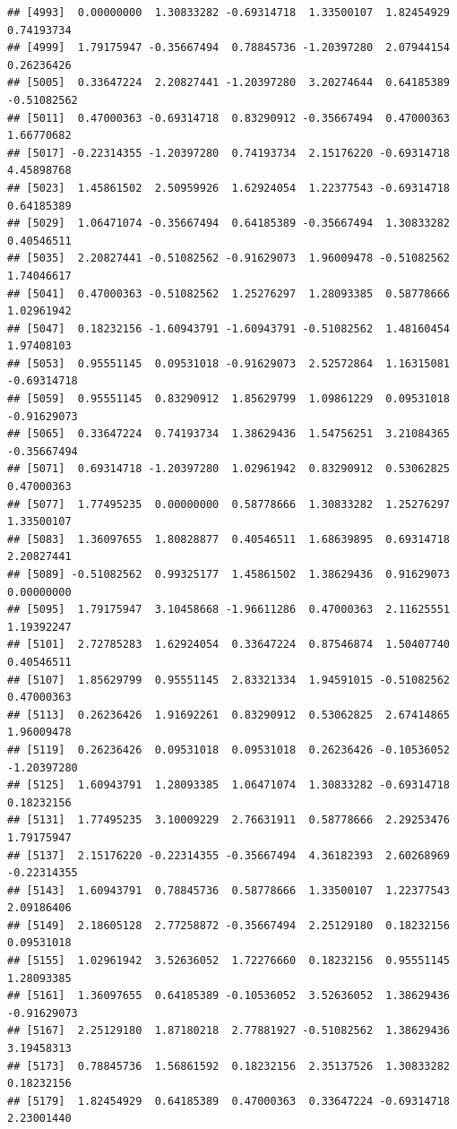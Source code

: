 \documentclass[
]{article}
\begin{document}
\begin{verbatim}
## [4993]  0.00000000  1.30833282 -0.69314718  1.33500107  1.82454929  0.74193734
## [4999]  1.79175947 -0.35667494  0.78845736 -1.20397280  2.07944154  0.26236426
## [5005]  0.33647224  2.20827441 -1.20397280  3.20274644  0.64185389 -0.51082562
## [5011]  0.47000363 -0.69314718  0.83290912 -0.35667494  0.47000363  1.66770682
## [5017] -0.22314355 -1.20397280  0.74193734  2.15176220 -0.69314718  4.45898768
## [5023]  1.45861502  2.50959926  1.62924054  1.22377543 -0.69314718  0.64185389
## [5029]  1.06471074 -0.35667494  0.64185389 -0.35667494  1.30833282  0.40546511
## [5035]  2.20827441 -0.51082562 -0.91629073  1.96009478 -0.51082562  1.74046617
## [5041]  0.47000363 -0.51082562  1.25276297  1.28093385  0.58778666  1.02961942
## [5047]  0.18232156 -1.60943791 -1.60943791 -0.51082562  1.48160454  1.97408103
## [5053]  0.95551145  0.09531018 -0.91629073  2.52572864  1.16315081 -0.69314718
## [5059]  0.95551145  0.83290912  1.85629799  1.09861229  0.09531018 -0.91629073
## [5065]  0.33647224  0.74193734  1.38629436  1.54756251  3.21084365 -0.35667494
## [5071]  0.69314718 -1.20397280  1.02961942  0.83290912  0.53062825  0.47000363
## [5077]  1.77495235  0.00000000  0.58778666  1.30833282  1.25276297  1.33500107
## [5083]  1.36097655  1.80828877  0.40546511  1.68639895  0.69314718  2.20827441
## [5089] -0.51082562  0.99325177  1.45861502  1.38629436  0.91629073  0.00000000
## [5095]  1.79175947  3.10458668 -1.96611286  0.47000363  2.11625551  1.19392247
## [5101]  2.72785283  1.62924054  0.33647224  0.87546874  1.50407740  0.40546511
## [5107]  1.85629799  0.95551145  2.83321334  1.94591015 -0.51082562  0.47000363
## [5113]  0.26236426  1.91692261  0.83290912  0.53062825  2.67414865  1.96009478
## [5119]  0.26236426  0.09531018  0.09531018  0.26236426 -0.10536052 -1.20397280
## [5125]  1.60943791  1.28093385  1.06471074  1.30833282 -0.69314718  0.18232156
## [5131]  1.77495235  3.10009229  2.76631911  0.58778666  2.29253476  1.79175947
## [5137]  2.15176220 -0.22314355 -0.35667494  4.36182393  2.60268969 -0.22314355
## [5143]  1.60943791  0.78845736  0.58778666  1.33500107  1.22377543  2.09186406
## [5149]  2.18605128  2.77258872 -0.35667494  2.25129180  0.18232156  0.09531018
## [5155]  1.02961942  3.52636052  1.72276660  0.18232156  0.95551145  1.28093385
## [5161]  1.36097655  0.64185389 -0.10536052  3.52636052  1.38629436 -0.91629073
## [5167]  2.25129180  1.87180218  2.77881927 -0.51082562  1.38629436  3.19458313
## [5173]  0.78845736  1.56861592  0.18232156  2.35137526  1.30833282  0.18232156
## [5179]  1.82454929  0.64185389  0.47000363  0.33647224 -0.69314718  2.23001440

\end{verbatim}
\end{document}
